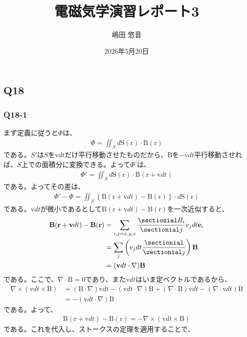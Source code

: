 \documentclass[platex,dvipdfmx,a4paper]{jsarticle}
\title{電磁気学演習レポート3}
\author{嶋田 悠音}
\date{2026年5月20日}
\newcommand{\hb}[2]{\frac{\sectionial #1}{\sectionial #2}}
\newcommand{\vect}[1]{\boldsymbol{\mathrm{#1}}}
\begin{document}
  \maketitle
  \subsection*{Q18}
  \subsubsection*{Q18-1}
  まず定義に従うと$\Phi$は、
  \begin{align*}
    \Phi = \iint_S d\vect{S}(\vect{r}) \cdot \vect{B}(\vect{r})
  \end{align*}
  である。$S'$は$S$を$\vect{v}dt$だけ平行移動させたものだから、$\vect{B}$を$-\vect{v}dt$平行移動させれば、$S$上での面積分に変換できる。よって$\Phi'$は、
  \begin{align*}
    \Phi' = \iint_S d\vect{S}(\vect{r}) \cdot \vect{B}(\vect{r}+\vect{v}dt)
  \end{align*}
  である。よってその差は、
  \begin{align*}
    \Phi' - \Phi = \iint_S \left\{ \vect{B}(\vect{r}+\vect{v}dt) - \vect{B}(\vect{r}) \right\} \cdot d\vect{S}(\vect{r})
  \end{align*}
  である。$\vect{v}dt$が微小であるとして$\vect{B}(\vect{r}+\vect{v}dt) - \vect{B}(\vect{r})$を一次近似すると、
  \begin{align*}
    \vect{B}(\vect{r}+\vect{v}dt) - \vect{B}(\vect{r}) &= \sum_{i,j=x,y,z}\hb{B_i}{j}v_jdt \vect{e}_i \\
    &= \sum_j \left( v_j dt\hb{}{j}\right) \vect{B}\\
    &= (\vect{v}dt \cdot \nabla) \vect{B}
  \end{align*}
  である。ここで、$\nabla \cdot \vect{B}=0$であり、また$\vect{v}dt$はいま定ベクトルであるから、
  \begin{align*}
    \nabla \times (\vect{v}dt \times \vect{B}) &= (\vect{B} \cdot \nabla)\vect{v}dt -(\vect{v}dt \cdot \nabla)\vect{B} + (\nabla \cdot \vect{B})\vect{v}dt - (\nabla \cdot \vect{v}dt)\vect{B}\\
    &= -(\vect{v}dt \cdot \nabla)\vect{B}
  \end{align*}
  である。よって、
  \begin{align*}
    \vect{B}(\vect{r}+\vect{v}dt) - \vect{B}(\vect{r}) = -\nabla \times (\vect{v}dt \times \vect{B})
  \end{align*}
  である。これを代入し、ストークスの定理を適用することで、
\end{document}
